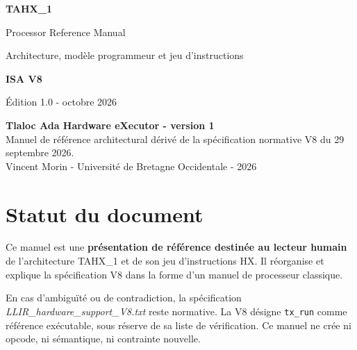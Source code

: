 \documentclass[10pt,a4paper,twoside,openany]{book}
\newcommand{\sourceviii}{\textit{LLIR\_hardware\_support\_V8.txt}}
\begin{document}
\hypersetup{pageanchor=false}
\begin{titlepage}
\thispagestyle{empty}
\vspace*{17mm}
{\color{white}\fontsize{34}{38}\selectfont\bfseries TAHX\_1\par}
\vspace{3mm}
{\color{white}\fontsize{20}{24}\selectfont Processor Reference Manual\par}
\vspace{6mm}
{\color{white}\large Architecture, modèle programmeur et jeu d'instructions\par}
\vspace{35mm}
{\fontsize{18}{22}\selectfont\bfseries ISA V8\par}
\vspace{2mm}
{\large Édition 1.0 - octobre 2026\par}
\vfill
\begin{minipage}{0.78\textwidth}
\small
\textbf{Tlaloc Ada Hardware eXecutor - version 1}\\[3pt]
Manuel de référence architectural dérivé de la spécification normative V8 du 29 septembre 2026.\\[8pt]
Vincent Morin - Université de Bretagne Occidentale - 2026
\end{minipage}
\end{titlepage}

\clearpage
{}
\hypersetup{pageanchor=true}
\chapter*{Statut du document}
Ce manuel est une \textbf{présentation de référence destinée au lecteur humain} de l'architecture TAHX\_1 et de son jeu d'instructions HX. Il réorganise et explique la spécification V8 dans la forme d'un manuel de processeur classique.

\begin{warningbox}
En cas d'ambiguïté ou de contradiction, la spécification \sourceviii{} reste normative. La V8 désigne \texttt{tx\_run} comme référence exécutable, sous réserve de sa liste de vérification. Ce manuel ne crée ni opcode, ni sémantique, ni contrainte nouvelle.
\end{warningbox}
\end{document}
